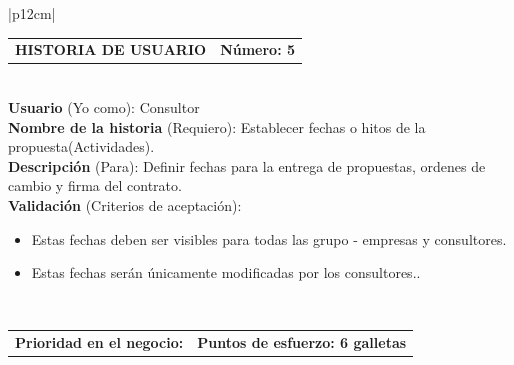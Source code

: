 \documentclass[11pt,letterpaper]{report}
\begin{document}
		\begin{center}	
			\begin{tabular}{|p{12cm}|}
				\hline
				\begin{tabular}{c|c}
					\textbf{HISTORIA DE USUARIO} & \textbf{Número: 5} \\
				\end{tabular} \\ \hline
				\textbf{Usuario} (Yo como): Consultor \\ \hline
				\textbf{Nombre de la historia} (Requiero): Establecer fechas o hitos de la propuesta(Actividades). \\ \hline
				\textbf{Descripción} (Para): Definir fechas para la entrega de propuestas, ordenes de cambio y firma del contrato. \\ \hline
				\textbf{Validación} (Criterios de aceptación): \\
				\begin{minipage}{12cm}
					\begin{itemize}
						\item Estas fechas deben ser visibles para todas las grupo - empresas y consultores.
						\item Estas fechas serán únicamente modificadas por los consultores..
					\end{itemize}
				\end{minipage} \\ \hline
				\begin{tabular}{p{6cm}|c}
					\textbf{Prioridad en el negocio: } & \textbf{Puntos de esfuerzo: 6 galletas} \\
				\end{tabular} \\ \hline
			\end{tabular}
		\end{center}
	
\end{document}
